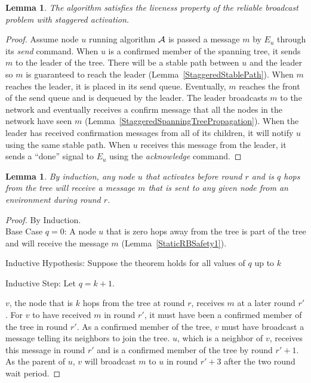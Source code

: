 \documentclass[english]{article}
\newtheorem{lemma}[theorem]{Lemma}
\begin{document}
\begin{lemma}
\label{StaggeredRBLiveness}
The algorithm satisfies the liveness property of the reliable broadcast problem with staggered activation.
\end{lemma}
\begin{proof}

Assume node $u$ running algorithm $\cal A$ is passed a message $m$ by $E_u$ through its \textit{send} command. When $u$ is a confirmed member of the spanning tree, it sends $m$ to the leader of the tree. There will be a stable path between $u$ and the leader so $m$ is guaranteed to reach the leader (Lemma~\ref{StaggeredStablePath}). When $m$ reaches the leader, it is placed in its send queue. Eventually, $m$ reaches the front of the send queue and is dequeued by the leader. The leader broadcasts $m$ to the network and eventually receives a confirm message that all the nodes in the network have seen $m$ (Lemma~\ref{StaggeredSpanningTreePropagation}). When the leader has received confirmation messages from all of its children, it will notify $u$ using the same stable path. When $u$ receives this message from the leader, it sends  a ``done'' signal to $E_u$ using the \textit{acknowledge} command.

\end{proof}

\begin{lemma}
\label{RBSafety1ByInduction}
  By induction, any node $u$ that activates before round $r$ and is $q$ hops from the tree will receive a message $m$ that is sent to any given node from an environment during round $r$.
\end{lemma}
\begin{proof} By Induction. \\

\noindent Base Case $q=0$: A node $u$ that is zero hops away from the tree is part of the tree and will receive the message $m$ (Lemma~\ref{StaticRBSafety1}).

\noindent Inductive Hypothesis: Suppose the theorem holds for all values of $q$ up to $k$

\noindent Inductive Step: Let $q=k+1$.

$v$, the node that is $k$ hops from the tree at round $r$, receives $m$ at a later round $r'$. For $v$ to have received $m$ in round $r'$, it must have been a confirmed member of the tree in round $r'$. As a confirmed member of the tree, $v$ must have broadcast a message telling its neighbors to join the tree. $u$, which is a neighbor of $v$, receives this message in round $r'$ and is a confirmed member of the tree by round $r'+1$. As the parent of $u$, $v$ will broadcast $m$ to $u$ in round $r'+3$ after the two round wait period.

\end{proof}
\end{document}
